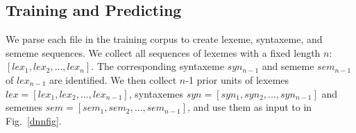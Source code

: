 




\subsection{Training and Predicting}

  We parse each file in the training
corpus to create lexeme, syntaxeme, and sememe sequences. We collect
all sequences of lexemes with a fixed length $n$: $[lex_1, lex_2,...,
  lex_n]$. The corresponding syntaxeme $syn_{n-1}$ and sememe
$sem_{n-1}$ of $lex_{n-1}$ are identified. We then collect $n$-1 prior
units of lexemes $lex=[lex_1, lex_2,..., lex_{n-1}]$, syntaxemes
$syn=[syn_1, syn_2,..., syn_{n-1}]$ and sememes $sem=[sem_1,
  sem_2,..., sem_{n-1}]$, and use them as input to {\tool} in
Fig.~\ref{dnnfig}. 

